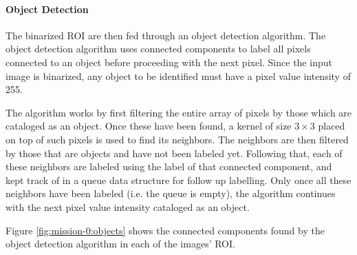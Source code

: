 \paragraph{Object Detection} \label{paragraph:case-study:impl:objects}
The binarized ROI are then fed through an object detection algorithm. The object detection algorithm uses connected components to label all pixels connected to an object before proceeding with the next pixel. Since the input image is binarized, any object to be identified must have a pixel value intensity of 255. 

The algorithm works by first filtering the entire array of pixels by those which are cataloged as an object. Once these have been found, a kernel of size $3 \times 3$ placed on top of such pixels is used to find its neighbors. The neighbors are then filtered by those that are objects and have not been labeled yet. Following that, each of these neighbors are labeled using the label of that connected component, and kept track of in a queue data structure for follow up labelling. Only once all these neighbors have been labeled (i.e. the queue is empty), the algorithm continues with the next pixel value intensity cataloged as an object.

Figure \ref{fig:mission-0:objects} shows the connected components found by the object detection algorithm in each of the images' ROI.

